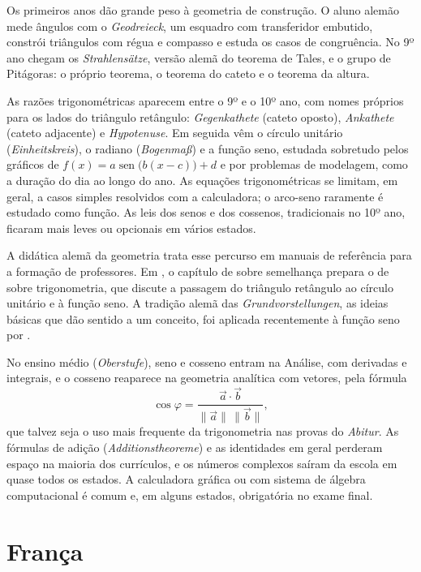 \documentclass[
    article,
    12pt,
    a4paper,
    sumario=tradicional
]{abntex2}
\begin{document}
Os primeiros anos dão grande peso à geometria de construção. O aluno alemão
mede ângulos com o \textit{Geodreieck}, um esquadro com transferidor
embutido, constrói triângulos com régua e compasso e estuda os casos de
congruência. No 9º ano chegam os \textit{Strahlensätze}, versão alemã do
teorema de Tales, e o grupo de Pitágoras: o próprio teorema, o teorema do
cateto e o teorema da altura.

As razões trigonométricas aparecem entre o 9º e o 10º ano, com nomes próprios
para os lados do triângulo retângulo: \textit{Gegenkathete} (cateto oposto),
\textit{Ankathete} (cateto adjacente) e \textit{Hypotenuse}. Em seguida vêm o
círculo unitário (\textit{Einheitskreis}), o radiano (\textit{Bogenmaß}) e a
função seno, estudada sobretudo pelos gráficos de
$f(x) = a\operatorname{sen}\bigl(b(x-c)\bigr) + d$ e por problemas de modelagem,
como a duração do dia ao longo do ano. As equações trigonométricas se limitam,
em geral, a casos simples resolvidos com a calculadora; o arco-seno raramente
é estudado como função. As leis dos senos e dos cossenos, tradicionais no
10º ano, ficaram mais leves ou opcionais em vários estados.

A didática alemã da geometria trata esse percurso em manuais de referência
para a formação de professores. Em , o capítulo de
 sobre semelhança prepara o de 
sobre trigonometria, que discute a passagem do triângulo retângulo ao círculo
unitário e à função seno. A tradição alemã das \textit{Grundvorstellungen},
as ideias básicas que dão sentido a um conceito, foi aplicada recentemente à
função seno por .

No ensino médio (\textit{Oberstufe}), seno e cosseno entram na Análise, com
derivadas e integrais, e o cosseno reaparece na geometria analítica com
vetores, pela fórmula
\[
\cos\varphi = \frac{\vec a \cdot \vec b}{\lVert \vec a\rVert\,\lVert \vec b\rVert},
\]
que talvez seja o uso mais frequente da trigonometria nas provas do
\textit{Abitur}. As fórmulas de adição (\textit{Additionstheoreme}) e as
identidades em geral perderam espaço na maioria dos currículos, e os números
complexos saíram da escola em quase todos os estados. A calculadora gráfica ou
com sistema de álgebra computacional é comum e, em alguns estados, obrigatória
no exame final.

\section{França}
\end{document}
